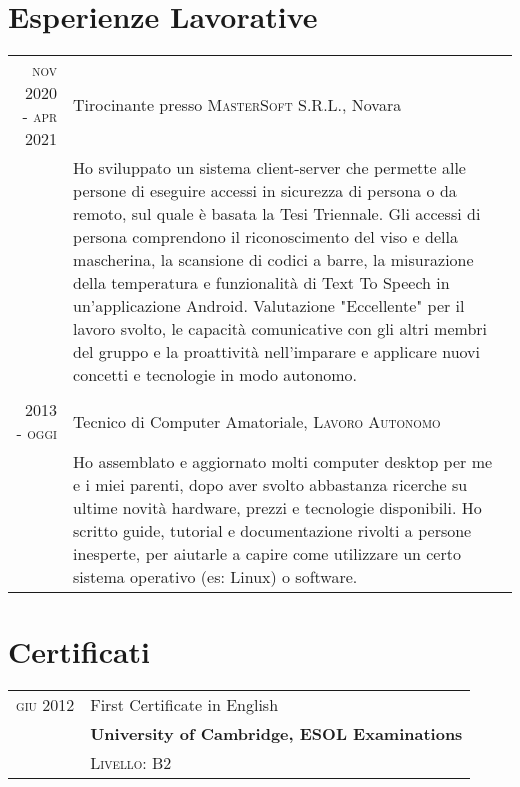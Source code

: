 \documentclass[a4paper,10pt]{article} %
\begin{document}

\section{Esperienze Lavorative}

\begin{tabular}{r|p{10.5cm}}
\textsc{nov 2020 - apr 2021} & Tirocinante presso \textsc{MasterSoft S.R.L.}, Novara \emph{}\\
& \footnotesize{Ho sviluppato un sistema client-server che permette alle persone di eseguire accessi in sicurezza di persona o da remoto, sul quale è basata la Tesi Triennale. Gli accessi di persona comprendono il riconoscimento del viso e della mascherina, la scansione di codici a barre, la misurazione della temperatura e funzionalità di Text To Speech in un'applicazione Android. Valutazione "Eccellente" per il lavoro svolto, le capacità comunicative con gli altri membri del gruppo e la proattività nell'imparare e applicare nuovi concetti e tecnologie in modo autonomo.}\\
\multicolumn{2}{c}{}\\


\textsc{2013 - oggi} & Tecnico di Computer Amatoriale, \textsc{Lavoro Autonomo} \emph{}\\
& \footnotesize{Ho assemblato e aggiornato molti computer desktop per me e i miei parenti, dopo aver svolto abbastanza ricerche su ultime novità hardware, prezzi e tecnologie disponibili. Ho scritto guide, tutorial e documentazione rivolti a persone inesperte, per aiutarle a capire come utilizzare un certo sistema operativo (es: Linux) o software.}
\end{tabular}


\section{Certificati}

\begin{tabular}{rp{10.5cm}}
\textsc{giu 2012} & First Certificate in English\\
& \textbf{University of Cambridge, ESOL Examinations}\\
& \textsc{Livello:} B2
\end{tabular}
\end{document}
